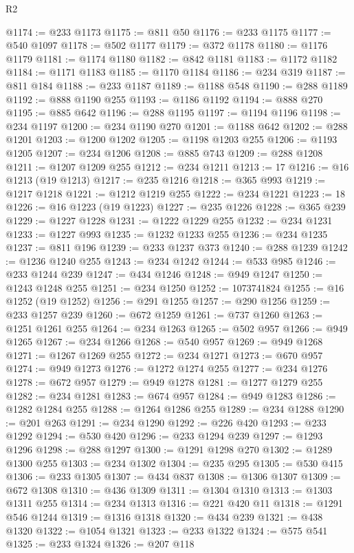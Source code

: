 \begin{lexlean}{R2}
\begin{coremodule}
@1174 := @233 @1173
@1175 := @811 @50
@1176 := @233 @1175
@1177 := @540 @1097
@1178 := @502 @1177
@1179 := @372 @1178
@1180 := @1176 @1179
@1181 := @1174 @1180
@1182 := @842 @1181
@1183 := @1172 @1182
@1184 := @1171 @1183
@1185 := @1170 @1184
@1186 := @234 @319
@1187 := @811 @184
@1188 := @233 @1187
@1189 := @1188 @548
@1190 := @288 @1189
@1192 := @888 @1190 @255
@1193 := @1186 @1192
@1194 := @888 @270
@1195 := @885 @642
@1196 := @288 @1195
@1197 := @1194 @1196
@1198 := @234 @1197
@1200 := @234 @1190 @270
@1201 := @1188 @642
@1202 := @288 @1201
@1203 := @1200 @1202
@1205 := @1198 @1203 @255
@1206 := @1193 @1205
@1207 := @234 @1206
@1208 := @885 @743
@1209 := @288 @1208
@1211 := @1207 @1209 @255
@1212 := @234 @1211
@1213 := 17
@1216 := @16 @1213 (@19 @1213)
@1217 := @235 @1216
@1218 := @365 @993
@1219 := @1217 @1218
@1221 := @1212 @1219 @255
@1222 := @234 @1221
@1223 := 18
@1226 := @16 @1223 (@19 @1223)
@1227 := @235 @1226
@1228 := @365 @239
@1229 := @1227 @1228
@1231 := @1222 @1229 @255
@1232 := @234 @1231
@1233 := @1227 @993
@1235 := @1232 @1233 @255
@1236 := @234 @1235
@1237 := @811 @196
@1239 := @233 @1237 @373
@1240 := @288 @1239
@1242 := @1236 @1240 @255
@1243 := @234 @1242
@1244 := @533 @985
@1246 := @233 @1244 @239
@1247 := @434 @1246
@1248 := @949 @1247
@1250 := @1243 @1248 @255
@1251 := @234 @1250
@1252 := 1073741824
@1255 := @16 @1252 (@19 @1252)
@1256 := @291 @1255
@1257 := @290 @1256
@1259 := @233 @1257 @239
@1260 := @672 @1259
@1261 := @737 @1260
@1263 := @1251 @1261 @255
@1264 := @234 @1263
@1265 := @502 @957
@1266 := @949 @1265
@1267 := @234 @1266
@1268 := @540 @957
@1269 := @949 @1268
@1271 := @1267 @1269 @255
@1272 := @234 @1271
@1273 := @670 @957
@1274 := @949 @1273
@1276 := @1272 @1274 @255
@1277 := @234 @1276
@1278 := @672 @957
@1279 := @949 @1278
@1281 := @1277 @1279 @255
@1282 := @234 @1281
@1283 := @674 @957
@1284 := @949 @1283
@1286 := @1282 @1284 @255
@1288 := @1264 @1286 @255
@1289 := @234 @1288
@1290 := @201 @263
@1291 := @234 @1290
@1292 := @226 @420
@1293 := @233 @1292
@1294 := @530 @420
@1296 := @233 @1294 @239
@1297 := @1293 @1296
@1298 := @288 @1297
@1300 := @1291 @1298 @270
@1302 := @1289 @1300 @255
@1303 := @234 @1302
@1304 := @235 @295
@1305 := @530 @415
@1306 := @233 @1305
@1307 := @434 @837
@1308 := @1306 @1307
@1309 := @672 @1308
@1310 := @436 @1309
@1311 := @1304 @1310
@1313 := @1303 @1311 @255
@1314 := @234 @1313
@1316 := @221 @420 @11
@1318 := @1291 @546 @1244
@1319 := @1316 @1318
@1320 := @434 @239
@1321 := @438 @1320
@1322 := @1054 @1321
@1323 := @233 @1322
@1324 := @575 @541
@1325 := @233 @1324
@1326 := @207 @118

\end{coremodule}
\end{lexlean}
